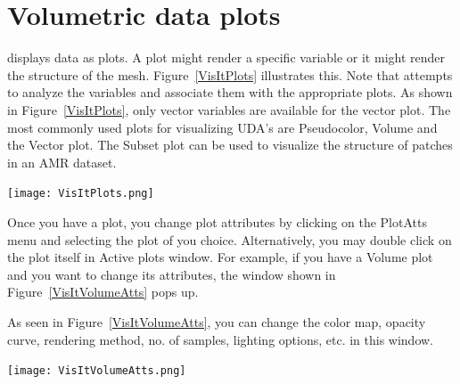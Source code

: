 \newpage
\begin{minipage}[t]{\textwidth}
  \begin{minipage}{0.6\textwidth}
  \vspace{-48pt}
  \section{Volumetric data plots}
  \Visit displays data as plots. A plot might render a specific variable
  or it might render the structure of the mesh. Figure~\ref{VisItPlots}
  illustrates this.
  Note that \Visit attempts to analyze the variables and associate them
  with the appropriate plots. As shown in Figure~\ref{VisItPlots}, only
  vector variables are available for the vector plot. The most commonly
  used plots for visualizing UDA's are Pseudocolor, Volume and the
  Vector plot. The Subset plot can be used to visualize the structure of
  patches in an AMR dataset.
  \end{minipage}
  \hspace{12pt}
  \begin{minipage}{0.35\textwidth}
    \centering
    \texttt{[image: VisItPlots.png]}
    \label{VisItPlots}
  \end{minipage}
\end{minipage}

\begin{minipage}[t]{\textwidth}
  \begin{minipage}{0.6\textwidth}
  \vspace{-96pt}
  Once you have a plot, you change plot attributes by clicking on the
  PlotAtts menu and selecting the plot of you choice. Alternatively, you
  may double click on the plot itself in Active plots window. For
  example, if you have a Volume plot and you want to change its
  attributes, the window shown in Figure~\ref{VisItVolumeAtts} pops up.

  As seen in Figure~\ref{VisItVolumeAtts}, you can change the color map,
  opacity curve, rendering method, no. of samples, lighting options,
  etc. in this window.
  \end{minipage}
  \hspace{12pt}
  \begin{minipage}{0.35\textwidth}
  \centering
  \texttt{[image: VisItVolumeAtts.png]}
  \label{VisItVolumeAtts}
  \end{minipage}
\end{minipage}

